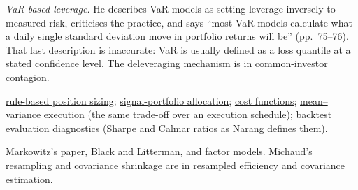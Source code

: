 \begin{qfmodel}
\emph{VaR-based leverage.} He describes VaR models as setting leverage inversely to measured risk, criticises the practice, and says ``most VaR models calculate what a daily single standard deviation move in portfolio returns will be'' (pp.~75--76). That last description is inaccurate: VaR is usually defined as a loss quantile at a stated confidence level. The deleveraging mechanism is in \hyperref[def:common-investor-contagion]{common-investor contagion}.

 \hyperref[meth:rule-based-position-sizing]{rule-based position sizing}; \hyperref[meth:signal-portfolio-allocation]{signal-portfolio allocation}; \hyperref[mod:portfolio-transaction-cost-function]{cost functions}; \hyperref[mod:almgren-chriss-execution]{mean--variance execution} (the same trade-off over an execution schedule); \hyperref[meth:backtest-evaluation-diagnostics]{backtest evaluation diagnostics} (Sharpe and Calmar ratios as Narang defines them).

 Markowitz's paper, Black and Litterman, and factor models. Michaud's resampling and covariance shrinkage are in \hyperref[meth:resampled-efficiency]{resampled efficiency} and \hyperref[meth:portfolio-covariance-estimation]{covariance estimation}.

\end{qfmodel}

